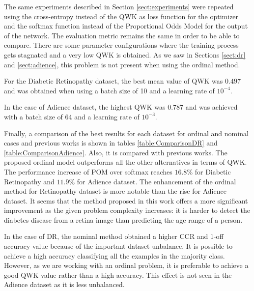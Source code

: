 \documentclass[journal]{IEEEtran}
\begin{document}
	The same experiments described in Section \ref{sect:experiments} were repeated using the cross-entropy instead of the QWK as loss function for the optimizer and the softmax function instead of the Proportional Odds Model for the output of the network. The evaluation metric remains the same in order to be able to compare. There are some parameter configurations where the training process gets stagnated and a very low QWK is obtained. As we saw in Sections \ref{sect:dr} and \ref{sect:adience}, this problem is not present when using the ordinal method.
	
	For the Diabetic Retinopathy dataset, the best mean value of QWK was $0.497$ and was obtained when using a batch size of 10 and a learning rate of $10^{-4}$.
	
	In the case of Adience dataset, the highest QWK was $0.787$ and was achieved with a batch size of 64 and a learning rate of $10^{-3}$.

	Finally, a comparison of the best results for each dataset for ordinal and nominal cases and previous works is shown in tables \ref{table:ComparisonDR} and \ref{table:ComparisonAdience}. Also, it is compared with previous works. The proposed ordinal model outperforms all the other alternatives in terms of QWK. The performance increase of POM over softmax reaches $16.8\%$ for Diabetic Retinopathy and $11.9\%$ for Adience dataset. The enhancement of the ordinal method for Retinopathy dataset is more notable than the rise for Adience dataset. It seems that the method proposed in this work offers a more significant improvement as the given problem complexity increases: it is harder to detect the diabetes disease from a retina image than predicting the age range of a person.
	
	In the case of DR, the nominal method obtained a higher CCR and 1-off accuracy value because of the important dataset unbalance. It is possible to achieve a high accuracy classifying all the examples in the majority class. However, as we are working with an ordinal problem, it is preferable to achieve a good QWK value rather than a high accuracy. This effect is not seen in the Adience dataset as it is less unbalanced.
	
\end{document}

